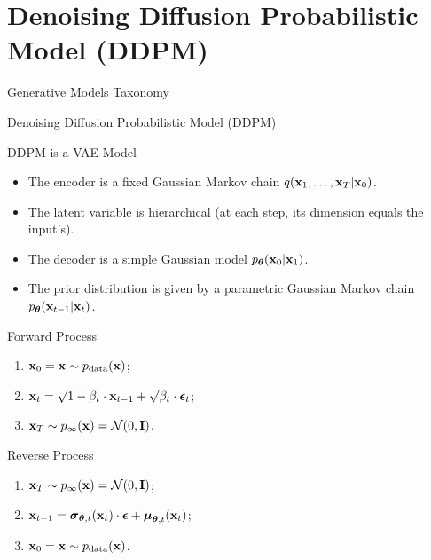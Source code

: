 \documentclass{beamer}
\begin{document}
\section{Denoising Diffusion Probabilistic Model (DDPM)}
\begin{frame}{Generative Models Taxonomy}
\end{frame}
\begin{frame}{Denoising Diffusion Probabilistic Model (DDPM)}
    \begin{block}{DDPM is a VAE Model}
        \begin{itemize}
            \item The encoder is a fixed Gaussian Markov chain $q(\mathbf{x}_1, \dots, \mathbf{x}_T | \mathbf{x}_0)$.
            \item The latent variable is hierarchical (at each step, its dimension equals the input's).
            \item The decoder is a simple Gaussian model $p_{\boldsymbol{\theta}}(\mathbf{x}_0 | \mathbf{x}_1)$.
            \item The prior distribution is given by a parametric Gaussian Markov chain $p_{\boldsymbol{\theta}}(\mathbf{x}_{t-1} | \mathbf{x}_t)$.
        \end{itemize}
    \end{block}
    \eqpause
    \begin{minipage}{0.5\linewidth}
        \begin{block}{Forward Process}
            \begin{enumerate}
                \item $\mathbf{x}_0 = \mathbf{x} \sim p_{\text{data}}(\mathbf{x})$;
                \item $\mathbf{x}_t = \sqrt{1 - \beta_t} \cdot \mathbf{x}_{t - 1} + \sqrt{\beta_t} \cdot \boldsymbol{\epsilon}_t$;
                \item $\mathbf{x}_T \sim p_{\infty}(\mathbf{x}) = \mathcal{N}(0, \mathbf{I})$.
            \end{enumerate}
        \end{block}
    \end{minipage}%
    \eqpause
    \begin{minipage}{0.55\linewidth}
        \begin{block}{Reverse Process}
            \begin{enumerate}
                \item $\mathbf{x}_T \sim p_{\infty}(\mathbf{x}) = \mathcal{N}(0, \mathbf{I})$;
                \item $\mathbf{x}_{t - 1} = \boldsymbol{\sigma}_{\boldsymbol{\theta}, t}(\mathbf{x}_t) \cdot \boldsymbol{\epsilon} + \boldsymbol{\mu}_{\boldsymbol{\theta}, t}(\mathbf{x}_t)$;
                \item $\mathbf{x}_0 = \mathbf{x} \sim p_{\text{data}}(\mathbf{x})$.
            \end{enumerate}
        \end{block}
    \end{minipage}
\end{frame}
\end{document}
